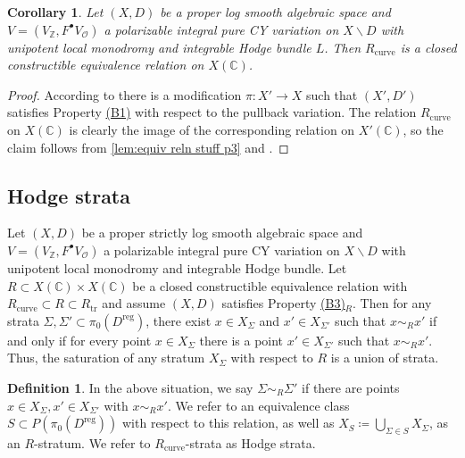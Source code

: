 \documentclass{amsart}
\newcommand{\customref}[2]{\hyperref[#1]{#2}}
\newcommand{\bs}{\backslash}
\newtheorem{cor}[theorem]{Corollary}
\theoremstyle{definition}
\newtheorem{defn}[theorem]{Definition}
\theoremstyle{remark}
\def\bZ{\mathbb{Z}}
\def\bC{\mathbb{C}}
\def\cO{\mathcal{O}}
\def\reg{\mathrm{reg}}
\def\trans{\mathrm{tr}}
\def\curve{\mathrm{curve}}
\numberwithin{equation}{section}
\begin{document}
\begin{cor}\label{cor:Rcurve is alg} Let $(X,D)$ be a proper log smooth algebraic space and $V=(V_\bZ,F^\bullet V_\cO)$ a polarizable integral pure CY variation on $X\bs D$ with unipotent local monodromy and integrable Hodge bundle $L$.  Then $R_\mathrm{curve}$ is a closed constructible equivalence relation on $X(\bC)$.
\end{cor}
\begin{proof}  According to  there is a modification $\pi:X'\to X$ such that $(X',D')$ satisfies Property \customref{b1}{(B1)} with respect to the pullback variation.  The relation $R_\mathrm{curve}$ on $X(\bC)$ is clearly the image of the corresponding relation on $X'(\bC)$, so the claim follows from \eqref{lem:equiv reln stuff p3} and .
\end{proof}




\subsection{Hodge strata}\label{subsect:Hodge strata}
Let $(X,D)$ be a proper strictly log smooth algebraic space and $V=(V_\bZ,F^\bullet V_\cO)$ a polarizable integral pure CY variation on $X\bs D$ with unipotent local monodromy and integrable Hodge bundle.  Let $R\subset X(\bC)\times X(\bC)$ be a closed constructible equivalence relation with $R_\curve\subset R\subset R_\trans$ and assume $(X,D)$ satisfies Property \customref{b3}{(B3)$_R$}.  Then for any strata $\Sigma,\Sigma'\subset \pi_0(D^\reg)$, there exist $x\in X_\Sigma$ and $x'\in X_{\Sigma'}$ such that $x\sim_R x'$ if and only if for every point $x\in X_\Sigma$ there is a point $x'\in X_{\Sigma'}$ such that $x\sim_R x'$.  Thus, the saturation of any stratum $X_\Sigma$ with respect to $R$ is a union of strata. 
\begin{defn}\label{defn:hodge strata}  
In the above situation, we say $\Sigma\sim_R\Sigma'$ if there are points $x\in X_{\Sigma},x'\in X_{\Sigma'}$ with $x\sim_R x'$.  We refer to an equivalence class $S\subset P(\pi_0(D^\reg))$ with respect to this relation, as well as $X_S\coloneqq  \bigcup_{\Sigma\in S}X_\Sigma$, as an $R$-stratum.  We refer to $R_\curve$-strata as Hodge strata. 

\end{defn}
\end{document}
